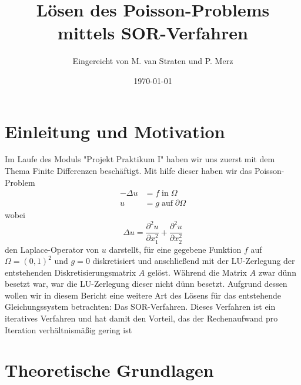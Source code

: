 \documentclass{scrartcl}
\title{Lösen des Poisson-Problems mittels SOR-Verfahren}
\author{%
  Eingereicht von M. van Straten und P. Merz
}
\date{\today}
\begin{document}
\maketitle
\tableofcontents
\cleardoublepage%

\section{Einleitung und Motivation}
Im Laufe des Moduls "Projekt Praktikum I" haben wir uns zuerst mit dem Thema
Finite Differenzen beschäftigt. Mit hilfe dieser haben wir das Poisson-Problem
\begin{align}\label{Eq:Poisson}
    -\Delta u & = f \; \text{in} \; \Omega           \\
    u         & = g \; \text{auf} \; \partial \Omega
\end{align}
wobei
\begin{equation*}
    \Delta u = \frac{\partial^2 u}{\partial x_1^2} + \frac{\partial^2 u}{\partial x_2^2}
\end{equation*}
den Laplace-Operator von \(u\) darstellt, für eine gegebene Funktion \(f\)
auf \(\Omega = {(0, 1)}^2\) und \(g = 0\) diskretisiert und anschließend mit
der LU-Zerlegung der entstehenden Diskretisierungsmatrix \(A\) gelöst. Während die Matrix \(A\) zwar dünn besetzt war,
war die LU-Zerlegung dieser nicht dünn besetzt. Aufgrund dessen wollen wir in diesem Bericht eine weitere Art des
Lösens für das entstehende Gleichungssystem betrachten: Das SOR-Verfahren. Dieses Verfahren ist ein iteratives Verfahren
und hat damit den Vorteil, das der Rechenaufwand pro Iteration verhältnismäßig gering ist \cite{AB3}

\section{Theoretische Grundlagen}
\end{document}
